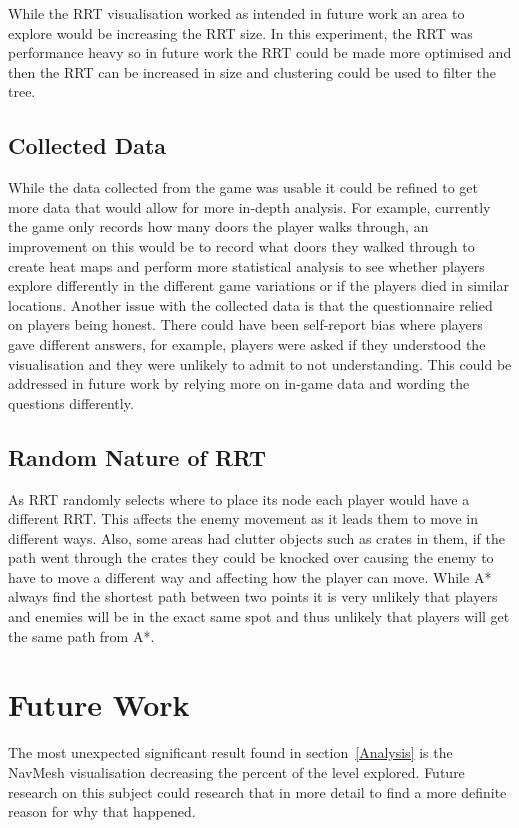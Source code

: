 \documentclass[journal]{IEEEtran}
\begin{document}
	While the RRT visualisation worked as intended in future work an area to explore would be increasing the RRT size.  In this experiment, the RRT was performance heavy so in future work the RRT could be made more optimised and then the RRT can be increased in size and clustering could be used to filter the tree.
	
	\subsection{Collected Data}    \label{CData}
	While the data collected from the game was usable it could be refined to get more data that would allow for more in-depth analysis. For example, currently the game only records how many doors the player walks through, an improvement on this would be to record what doors they walked through to create heat maps and perform more statistical analysis to see whether players explore differently in the different game variations or if the players died in similar locations.
	Another issue with the collected data is that the questionnaire relied on players being honest. There could have been self-report bias where players gave different answers, for example, players were asked if they understood the visualisation and they were unlikely to admit to not understanding. This could be addressed in future work by relying more on in-game data and wording the questions differently.
	
	\subsection{Random Nature of RRT}
	As RRT randomly selects where to place its node each player would have a different RRT. This affects the enemy movement as it leads them to move in different ways. Also, some areas had clutter objects such as crates in them, if the path went through the crates they could be knocked over causing the enemy to have to move a different way and affecting how the player can move. 
	While A* always find the shortest path between two points it is very unlikely that players and enemies will be in the exact same spot and thus unlikely that players will get the same path from A*. 
	
	
	\section{Future Work} \label{FutureWork}
	The most unexpected significant result found in section~\ref{Analysis} is the NavMesh visualisation decreasing the percent of the level explored. Future research on this subject could research that in more detail to find a more definite reason for why that happened. 
	
\end{document}
